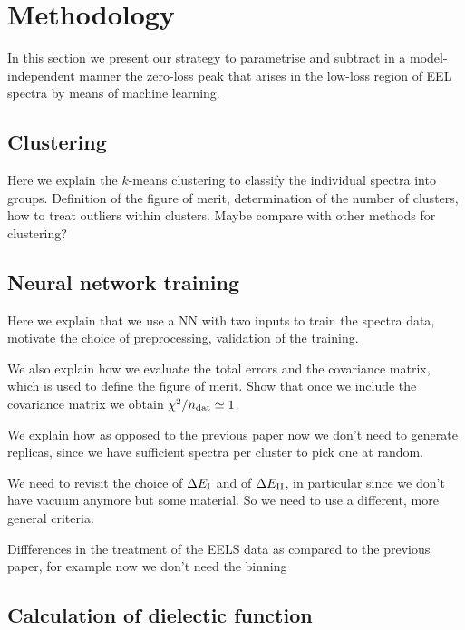 \section{Methodology}
\label{sec:methodology}

In this section we present our strategy to parametrise and subtract in a model-independent manner
the zero-loss peak that arises in the low-loss region of EEL spectra by means
of machine learning.



\subsection{Clustering}

Here we explain the $k$-means clustering to classify the individual
spectra into groups.
%
Definition of the figure of merit, determination of the number of clusters,
how to treat outliers within clusters.
%
Maybe compare with other methods for clustering? 

\subsection{Neural network training}

Here we explain that we use a NN with two inputs to train the spectra data,
motivate the choice of preprocessing, validation of the training.

We also explain how we evaluate the total errors and the covariance matrix,
which is used to define the figure of merit. Show that once we include the covariance matrix
we obtain $\chi^2/n_{\rm dat}\simeq 1$.

We explain how as opposed to the previous paper now we don't need to
generate replicas, since we have sufficient spectra per cluster to pick one at random.

We need to revisit the choice of $\Delta E_{\rm I}$ and of  $\Delta E_{\rm II}$, in particular
since we don't have vacuum anymore but some material. So we need to use
a different, more general criteria.

Diffferences in the treatment of the EELS data as compared to the previous paper,
for example now we don't need the binning


\subsection{Calculation of dielectic function}

